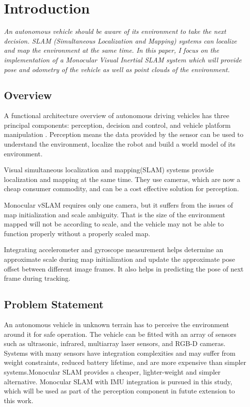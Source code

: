 \setlength{\footskip}{8mm}

\chapter{Introduction}

\textit{An autonomous vehicle should be aware of its environment to take the next decision. SLAM (Simultaneous Localization and Mapping) systems can localize and map the environment at the same time. In this paper, I focus on the implementation of a Monocular Visual Inertial SLAM system which will provide pose and odometry of the vehicle as well as point clouds of the environment.}

\section{Overview}

A functional architecture overview of autonomous driving vehicles has three principal components: perception, decision and control, and vehicle platform manipulation . Perception means the data provided by the sensor can be used to understand the environment, localize the robot and build a world model of its environment.

Visual simultaneous localization and mapping(SLAM) systems provide localization and mapping at the same time. They use cameras, which are now a cheap consumer commodity, and can be a cost effective solution for perception.

Monocular vSLAM requires only one camera, but it suffers from the issues of map initialization and scale ambiguity. That is the size of the environment mapped will not be according to scale, and the vehicle may not be able to function properly without a properly scaled map.

Integrating accelerometer and gyroscope measurement helps determine an approximate scale during map initialization and update the approximate pose offset between different image frames. It also helps in predicting the pose of next frame during tracking.


\section{Problem Statement}

An autonomous vehicle in unknown terrain has to perceive the environment around it for safe operation. The vehicle can be fitted with an array of sensors such as ultrasonic, infrared, multiarray laser sensors, and RGB-D cameras. Systems with many sensors have integration complexities and may suffer from weight constraints, reduced battery lifetime, and are more expensive than simpler systems.Monocular SLAM provides a cheaper, lighter-weight and simpler alternative. Monocular SLAM with IMU integration is pursued in this study, which will be used as part of the perception component in futute extension to this work.


